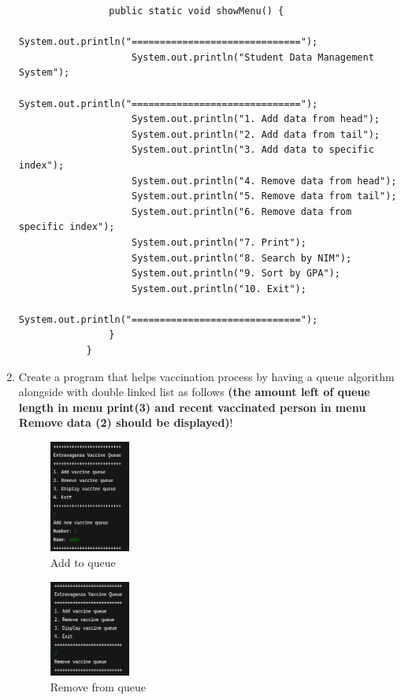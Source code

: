 \documentclass[12pt,titlepage]{article}
\begin{document}
\begin{enumerate}
{\begin{verbatim}
                public static void showMenu() {
                    System.out.println("==============================");
                    System.out.println("Student Data Management System");
                    System.out.println("==============================");
                    System.out.println("1. Add data from head");
                    System.out.println("2. Add data from tail");
                    System.out.println("3. Add data to specific index");
                    System.out.println("4. Remove data from head");
                    System.out.println("5. Remove data from tail");
                    System.out.println("6. Remove data from specific index");
                    System.out.println("7. Print");
                    System.out.println("8. Search by NIM");
                    System.out.println("9. Sort by GPA");
                    System.out.println("10. Exit");
                    System.out.println("==============================");
                }
            }
        \end{verbatim}
    }
    \pagebreak
    \item {
        Create a program that helps vaccination process by having a queue algorithm alongside with
        double linked list as follows \textbf{(the amount left of queue length in menu print(3) and recent
        vaccinated person in menu Remove data (2) should be displayed)}!

        \begin{figure}[h]
            \centering
            \includegraphics[width=0.25\textwidth]{./images/3-1.png}
            \caption{Add to queue}
        \end{figure}

        \begin{figure}[h]
            \centering
            \includegraphics[width=0.25\textwidth]{./images/3-2.png}
            \caption{Remove from queue}
        \end{figure}

}
\end{enumerate}
\end{document}
